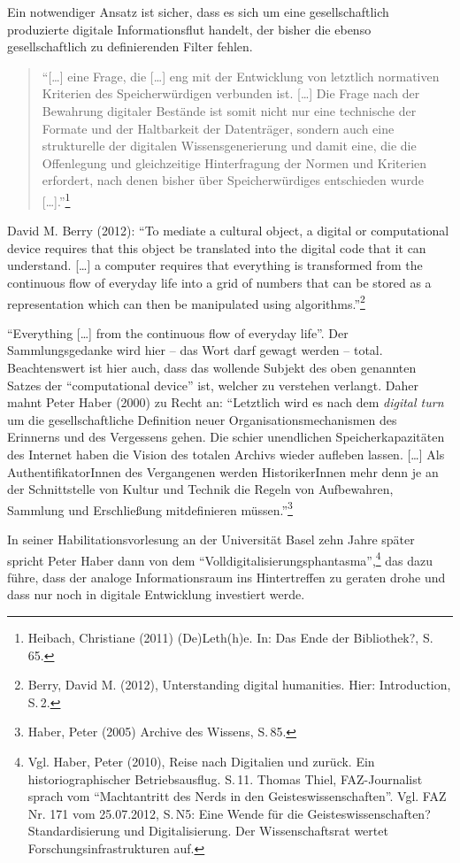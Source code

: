 \documentclass[a4paper,
fontsize=11pt,
oneside,
numbers=noperiodatend,
parskip=half-,
bibliography=totoc,
final
]{scrartcl}
\begin{document}
Ein notwendiger Ansatz ist sicher, dass es sich um eine gesellschaftlich
produzierte digitale Informationsflut handelt, der bisher die ebenso
gesellschaftlich zu definierenden Filter fehlen.

\begin{quote}
\enquote{{[}\ldots{}{]} eine Frage, die {[}\ldots{}{]} eng mit der
Entwicklung von letztlich normativen Kriterien des Speicherwürdigen
verbunden ist. {[}\ldots{}{]} Die Frage nach der Bewahrung digitaler
Bestände ist somit nicht nur eine technische der Formate und der
Haltbarkeit der Datenträger, sondern auch eine strukturelle der
digitalen Wissensgenerierung und damit eine, die die Offenlegung und
gleichzeitige Hinterfragung der Normen und Kriterien erfordert, nach
denen bisher über Speicherwürdiges entschieden wurde
{[}\ldots{}{]}.}\footnote{Heibach, Christiane (2011) (De)Leth(h)e. In:
  Das Ende der Bibliothek?, S.\,65.}
\end{quote}

David M. Berry (2012): \enquote{To mediate a cultural object, a digital
or computational device requires that this object be translated into the
digital code that it can understand. {[}\ldots{}{]} a computer requires
that everything is transformed from the continuous flow of everyday life
into a grid of numbers that can be stored as a representation which can
then be manipulated using algorithms.}\footnote{Berry, David M. (2012),
  Unterstanding digital humanities. Hier: Introduction, S.\,2.}

\enquote{Everything {[}\ldots{}{]} from the continuous flow of everyday
life}. Der Sammlungsgedanke wird hier -- das Wort darf gewagt werden --
total. Beachtenswert ist hier auch, dass das wollende Subjekt des oben
genannten Satzes der \enquote{computational device} ist, welcher zu
verstehen verlangt. Daher mahnt Peter Haber (2000) zu Recht an:
\enquote{Letztlich wird es nach dem \emph{digital turn} um die
gesellschaftliche Definition neuer Organisationsmechanismen des
Erinnerns und des Vergessens gehen. Die schier unendlichen
Speicherkapazitäten des Internet haben die Vision des totalen Archivs
wieder aufleben lassen. {[}\ldots{}{]} Als AuthentifikatorInnen des
Vergangenen werden HistorikerInnen mehr denn je an der Schnittstelle von
Kultur und Technik die Regeln von Aufbewahren, Sammlung und Erschließung
mitdefinieren müssen.}\footnote{Haber, Peter (2005) Archive des Wissens,
  S.\,85.}

In seiner Habilitationsvorlesung an der Universität Basel zehn Jahre
später spricht Peter Haber dann von dem
\enquote{Volldigitalisierungsphantasma},\footnote{Vgl. Haber, Peter
  (2010), Reise nach Digitalien und zurück. Ein historiographischer
  Betriebsausflug. S.\,11. Thomas Thiel, FAZ-Journalist sprach vom
  \enquote{Machtantritt des Nerds in den Geisteswissenschaften}. Vgl.
  FAZ Nr. 171 vom 25.07.2012, S.\,N5: Eine Wende für die
  Geisteswissenschaften? Standardisierung und Digitalisierung. Der
  Wissenschaftsrat wertet Forschungsinfrastrukturen auf.} das dazu
führe, dass der analoge Informationsraum ins Hintertreffen zu geraten
drohe und dass nur noch in digitale Entwicklung investiert werde.
\end{document}
